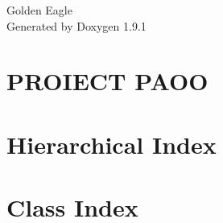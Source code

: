 \let\mypdfximage\pdfximage\def\pdfximage{\immediate\mypdfximage}\documentclass[twoside]{book}
\newcommand{\+}{\discretionary{\mbox{\scriptsize$\hookleftarrow$}}{}{}}
\newcommand{\clearemptydoublepage}{%
  \newpage{\pagestyle{empty}\cleardoublepage}%
}
\begin{document}
\raggedbottom

\hypersetup{pageanchor=false,
             bookmarksnumbered=true,
             pdfencoding=unicode
            }
\begin{titlepage}
\vspace*{7cm}
\begin{center}%
{\Large Golden Eagle }\\
\vspace*{1cm}
{\large Generated by Doxygen 1.9.1}\\
\end{center}
\end{titlepage}
\clearemptydoublepage
{}
\tableofcontents
\clearemptydoublepage
{}
\hypersetup{pageanchor=true}

\chapter{PROIECT PAOO}
\label{index}\hypertarget{index}{}
\chapter{Hierarchical Index}

\chapter{Class Index}

\end{document}
